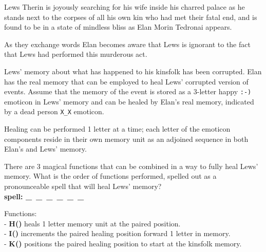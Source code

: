 \documentclass{article}
\begin{document}
\noindent {}


Lews Therin is joyously searching for his wife
inside his charred palace as he stands
next to the corpses of all his own kin who had met their fatal end,
and is found to be in a state of mindless bliss
as Elan Morin Tedronai appears.

As they exchange words Elan becomes aware that
Lews is ignorant to the fact that Lews had
performed this murderous act.

Lews' memory about what has happened to his kinsfolk has been corrupted.
Elan has the real memory that can be employed to heal Lews' corrupted
version of events.
Assume that the memory of the event is stored as a 3-letter happy \texttt{:-)} emoticon
in Lews' memory and can be healed by Elan's real memory,
indicated by a dead person \texttt{X\_X} emoticon.

Healing can be performed 1 letter at a time; each letter of the
emoticon components reside in their own memory unit as an adjoined sequence
in both Elan's and Lews' memory.

There are 3 magical functions that can be combined in a way
to fully heal Lews' memory.
What is the order of functions performed,
spelled out as a pronounceable spell
that will heal Lews' memory?\\
\hspace*{0.8cm}\textbf{spell: \_\ \_\ \_\ \_\ \_\ \_}

\noindent Functions:\\
\hspace*{0.2cm} - \hspace*{0.2cm}\textbf{H()} heals 1 letter memory unit at the paired position.\\
\hspace*{0.2cm} - \hspace*{0.2cm}\textbf{I()} increments the paired healing position forward 1 letter in memory.\\
\hspace*{0.2cm} - \hspace*{0.2cm}\textbf{K()} positions the paired healing position to start at the kinsfolk memory.
\end{document}
